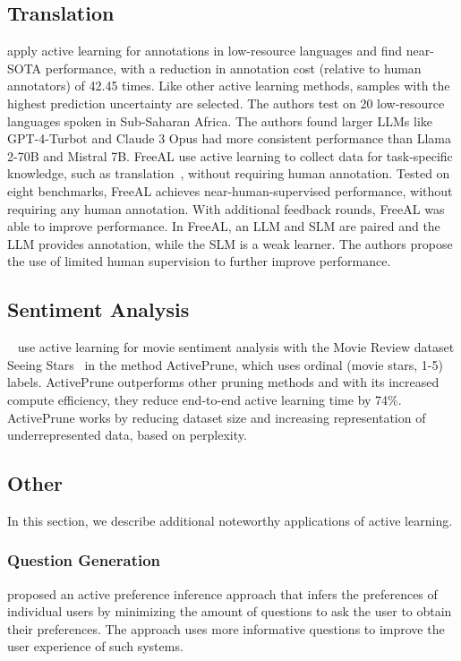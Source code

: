 \subsection{Translation}\label{apps-translation}

\citet{kholodna2024llms} apply active learning for annotations in low-resource languages and find near-SOTA performance, with a reduction in annotation cost (relative to human annotators) of 42.45 times. Like other active learning methods, samples with the highest prediction uncertainty are selected. The authors test on 20 low-resource languages spoken in Sub-Saharan Africa. The authors found larger LLMs like GPT-4-Turbot and Claude 3 Opus had more consistent performance than Llama 2-70B and Mistral 7B. 
FreeAL use active learning to collect data for task-specific knowledge, such as translation~\cite{xiao2023freeal}, without requiring human annotation. Tested on eight benchmarks, FreeAL achieves near-human-supervised performance, without requiring any human annotation. With additional feedback rounds, FreeAL was able to improve performance. In FreeAL, an LLM and SLM are paired and the LLM provides annotation, while the SLM is a weak learner. The authors propose the use of limited human supervision to further improve performance.


\subsection{Sentiment Analysis}\label{apps-sentiment-analysis}
~\citet{xiao2023freeal} use active learning for movie sentiment analysis with the Movie Review dataset Seeing Stars~\cite{pang2005seeingstarsexploitingclass} in the method ActivePrune, which uses ordinal (movie stars, 1-5) labels.
ActivePrune outperforms other pruning methods and with its increased compute efficiency, they reduce end-to-end active learning time by 74\%. ActivePrune works by reducing dataset size and increasing representation of underrepresented data, based on perplexity.


\subsection{Other}\label{sec-apps-other}
In this section, we describe additional noteworthy applications of active learning.

\subsubsection{Question Generation}\label{sec-apps-other-question-generation}
\citet{piriyakulkij2023active} proposed an active preference inference approach that infers the preferences of individual users by minimizing the amount of questions to ask the user to obtain their preferences.
The approach uses more informative questions to improve the user experience of such systems.



